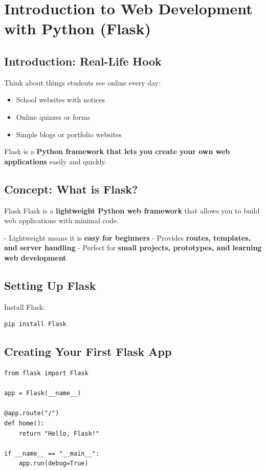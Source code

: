 \chapter{Introduction to Web Development with Python (Flask)}

\section{Introduction: Real-Life Hook}

Think about things students see online every day:

\begin{itemize}
    \item School websites with notices  
    \item Online quizzes or forms  
    \item Simple blogs or portfolio websites  
\end{itemize}

Flask is a \textbf{Python framework that lets you create your own web applications} easily and quickly.

\section{Concept: What is Flask?}

\begin{definition}{Flask}
Flask is a \textbf{lightweight Python web framework} that allows you to build web applications with minimal code.
\end{definition}

- Lightweight means it is \textbf{easy for beginners}  
- Provides \textbf{routes, templates, and server handling}  
- Perfect for \textbf{small projects, prototypes, and learning web development}

\section{Setting Up Flask}

Install Flask:

\begin{verbatim}
pip install Flask
\end{verbatim}

\section{Creating Your First Flask App}

\begin{verbatim}
from flask import Flask

app = Flask(__name__)

@app.route("/")
def home():
    return "Hello, Flask!"

if __name__ == "__main__":
    app.run(debug=True)
\end{verbatim}

